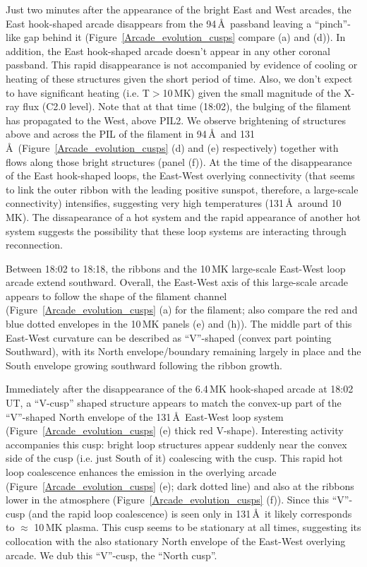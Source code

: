 \documentclass[preprint]{aastex}
\begin{document}
Just two minutes after the appearance of the bright East and West arcades, the East hook-shaped arcade disappears from the 94\,\AA\ passband leaving a ``pinch''-like gap behind it (Figure~\ref{Arcade_evolution_cusps} compare (a) and (d)). In addition, the East hook-shaped arcade doesn't appear in any other coronal passband. This rapid disappearance is not accompanied by evidence of cooling or heating of these structures given the short period of time. Also, we don't expect to have significant heating (i.e. T$>$10\,MK) given the small magnitude of the X-ray flux (C2.0 level). Note that at that time (18:02), the bulging of the filament has propagated to the West, above PIL2. We observe brightening of structures above and across the PIL of the filament in 94\,\AA\ and 131\,\AA\ (Figure~\ref{Arcade_evolution_cusps} (d) and (e) respectively) together with flows along those bright structures (panel (f)). At the time of the disappearance of the East hook-shaped loops, the East-West overlying connectivity (that seems to link the outer ribbon with the leading positive sunspot, therefore, a large-scale connectivity) intensifies, suggesting very high temperatures (131\,\AA\ around 10\,MK). The dissapearance of a hot system and the rapid appearance of another hot system suggests the possibility that these loop systems are interacting through reconnection.

Between 18:02 to 18:18, the ribbons and the 10\,MK large-scale East-West loop arcade extend southward. Overall, the East-West axis of this large-scale arcade appears to follow the shape of the filament channel (Figure~\ref{Arcade_evolution_cusps} (a) for the filament; also compare the red and blue dotted envelopes in the 10\,MK panels (e) and (h)). The middle part of this East-West curvature can be described as ``V''-shaped (convex part pointing Southward), with its North envelope/boundary remaining largely in place and the South envelope growing southward following the ribbon growth. 

Immediately after the disappearance of the 6.4\,MK hook-shaped arcade at 18:02 UT, a ``V-cusp'' shaped structure appears to match the convex-up part of the ``V''-shaped North envelope of the 131\,\AA\ East-West loop system (Figure~\ref{Arcade_evolution_cusps} (e) thick red V-shape). Interesting activity accompanies this cusp: bright loop structures appear suddenly near the convex side of the cusp (i.e. just South of it) coalescing with the cusp. This rapid hot loop coalescence enhances the emission in the overlying arcade (Figure~\ref{Arcade_evolution_cusps} (e); dark dotted line) and also at the ribbons lower in the atmosphere (Figure~\ref{Arcade_evolution_cusps} (f)). Since this ``V''-cusp (and the rapid loop coalescence) is seen only in 131\,\AA\ it likely corresponds to $\approx$ 10\,MK plasma. This cusp seems to be stationary at all times, suggesting its collocation with the also stationary North envelope of the East-West overlying arcade. We dub this ``V''-cusp, the ``North cusp''. 
\end{document}
